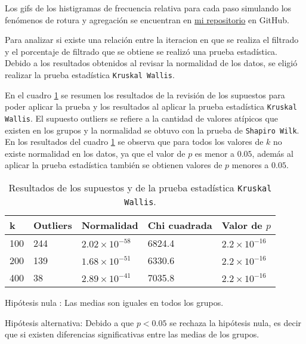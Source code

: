 \documentclass{article}
\begin{document}
Los gifs \citep{2} de los histigramas de frecuencia relativa para cada paso simulando los fenómenos de rotura y agregación se encuentran en \href{https://github.com/nataliaperez0/Simulation/tree/main/Tarea8}{mi repositorio} en GitHub.
\smallskip

Para analizar si existe una relación entre la iteracion en que se realiza el filtrado y el porcentaje de filtrado que se obtiene se realizó una prueba estadística. Debido a los resultados obtenidos al revisar la normalidad de los datos, se eligió realizar la prueba estadística \texttt{Kruskal Wallis}.
\bigskip

En el cuadro \ref{Cuadro1} se  resumen los resultados de la revisión de los supuestos para poder aplicar la prueba y los resultados al aplicar la prueba estadística \texttt{Kruskal Wallis}. El supuesto outliers se refiere a la cantidad de valores atípicos que existen en los grupos y la normalidad se obtuvo con la prueba de \texttt{Shapiro Wilk}. En los resultados del cuadro \ref{Cuadro1} se observa que para todos los valores de $k$ no existe normalidad en los datos, ya que el valor de $p$ es menor a $0.05$, además al aplicar la prueba estadística también se obtienen valores de $p$ menores a $0.05$.

\newpage

\begin{table}[ht]
\centering
\caption{Resultados de los supuestos y de la prueba estadística \texttt{Kruskal Wallis}.}
\smallskip

\begin{tabular}{ |p{1cm}|p{1.5cm}|p{2cm}|p{2.3cm}|p{2cm}|}
 \hline
 k & Outliers & Normalidad & Chi cuadrada & Valor de $p$ \\
 \hline
 100 & 244 &  $2.02\times 10^{-58}$ & 6824.4 & $2.2\times 10^{-16}$ \\
 \hline
 200 & 139 & $1.68\times 10^{-51}$ & 6330.6 & $2.2\times 10^{-16}$ \\
 \hline
 400 & 38 & $2.89\times 10^{-41}$ & 7035.8 & $2.2\times 10^{-16}$ \\
 \hline
\end{tabular}
\label{Cuadro1}
\end{table}

Hipótesis nula : Las medias son iguales en todos los grupos.
\smallskip

Hipótesis alternativa: Debido a que $p < 0.05$ se rechaza la hipótesis nula, es decir que si existen diferencias significativas entre las medias de los grupos. 
\smallskip
\end{document}
